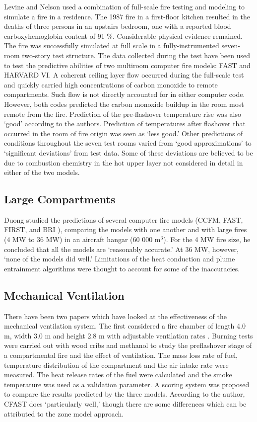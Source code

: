 Levine and Nelson \cite{Valid:Levine} used a combination of full-scale fire testing and modeling to simulate a fire in a residence. The 1987 fire in a first-floor kitchen resulted in the deaths of three persons in an upstairs bedroom, one with a reported blood carboxyhemoglobin content of 91 \%. Considerable physical evidence remained. The fire was successfully simulated at full scale in a fully-instrumented seven-room two-story test structure. The data collected during the test have been used to test the predictive abilities of two multiroom computer fire models: FAST and HARVARD VI. A coherent ceiling layer flow occurred during the full-scale test and quickly carried high concentrations of carbon monoxide to remote compartments. Such flow is not directly accounted for in either computer code. However, both codes predicted the carbon monoxide buildup in the room most remote from the fire. Prediction of the pre-flashover temperature rise was also `good' according to the authors. Prediction of temperatures after flashover that occurred in the room of fire origin was seen as `less good.' Other predictions of conditions throughout the seven test rooms varied from `good approximations' to `significant deviations' from test data. Some of these deviations are believed to be due to combustion chemistry in the hot upper layer not considered in detail in either of the two models.

\subsection{Large Compartments}

Duong \cite{Valid:Duong} studied the predictions of several computer fire models (CCFM, FAST, FIRST, and BRI \cite{Models:BRI}), comparing the models with one another and with large fires (4 MW to 36 MW) in an aircraft hangar (60 000 m$^3$). For the 4 MW fire size, he concluded that all the models are `reasonably accurate.' At 36 MW, however, `none of the models did well.' Limitations of the heat conduction and plume entrainment algorithms were thought to account for some of the inaccuracies.

\subsection{Mechanical Ventilation}

There have been two papers which have looked at the effectiveness of the mechanical ventilation system. The first considered a fire chamber of length 4.0 m, width 3.0 m and height 2.8 m with adjustable ventilation rates \cite{Chow:1995a}. Burning tests were carried out with wood cribs and methanol to study the preflashover stage of a compartmental fire and the effect of ventilation. The mass loss rate of fuel, temperature distribution of the compartment and the air intake rate were measured. The heat release rates of the fuel were calculated and the smoke temperature was used as a validation parameter. A scoring system was proposed to compare the results predicted by the three models. According to the author, CFAST does `particularly well,' though there are some differences which can be attributed to the zone model approach.

